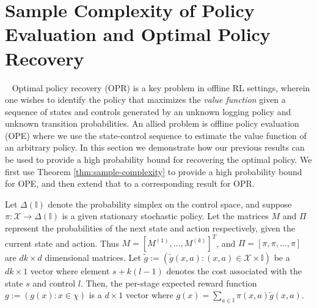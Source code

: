 \documentclass[opre,sglanonrev]{informs4}
\numberwithin{equation}{section}
\newcommand{\pow}[1]{^{(#1)}}
\newcommand{\lb}{\left[}
\newcommand{\rb}{\right]}
\begin{document}
{{\section{Sample Complexity of Policy Evaluation and Optimal Policy Recovery}~\label{sec:value}
Optimal policy recovery (OPR) is a key problem in offline RL settings, wherein one wishes to identify the policy that maximizes the \textit{value function} given a sequence of states and controls generated by an unknown logging policy and unknown transition probabilities. An allied problem is offline policy evaluation (OPE) where we use the state-control sequence to estimate the value function of an arbitrary policy. In this section we demonstrate how our previous results can be used to provide a high probability bound for recovering the optimal policy. We first use Theorem \ref{thm:sample-complexity} to provide a high probability bound for OPE, and then extend that to a corresponding result for OPR.

Let $\Delta(\mathbb{I})$ denote the probability simplex on the control space, and suppose $\pi : \mathcal X \to \Delta(\mathbb{I})$ is a given stationary stochastic policy. 
Let the matrices $M$ and $\Pi$ represent the probabilities of the next state and action respectively, given the current state and action. Thus $M=[M\pow 1,\dots,M\pow k]^T$, and $\Pi = \lb\pi,\pi,\dots,\pi\rb$ are $dk\times d$ dimensional matrices.
Let $\tilde g := (\tilde g(x,a) : (x,a) \in \mathcal X \times \mathbb{I})$ be a $dk\times 1$ vector where element $s+k(l-1)$ denotes the cost associated with the state $s$ and control $l$. Then, the per-stage expected reward function $g :=(g(x):x\in\chi )$ is a $d\times 1$ vector where $g(x)= \sum_{a \in \mathbb{I}} \pi(x,a) \tilde g(x,a)$. 

}}
\end{document}
